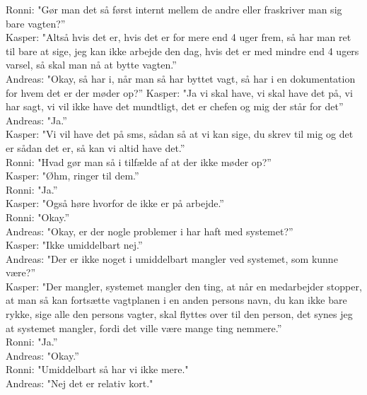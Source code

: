 Ronni: "Gør man det så først internt mellem de andre eller fraskriver man sig bare vagten?”\\
Kasper: "Altså hvis det er, hvis det er for mere end 4 uger frem, så har man ret til bare at sige, jeg kan ikke arbejde den dag, hvis det er med mindre end 4 ugers varsel, så skal man nå at bytte vagten.”\\
Andreas: "Okay, så har i, når man så har byttet vagt, så har i en dokumentation for hvem det er der møder op?”
Kasper: "Ja vi skal have, vi skal have det på, vi har sagt, vi vil ikke have det mundtligt, det er chefen og mig der står for det”\\
Andreas: "Ja.”\\
Kasper: "Vi vil have det på sms, sådan så at vi kan sige, du skrev til mig og det er sådan det er, så kan vi altid have det.”\\
Ronni: "Hvad gør man så i tilfælde af at der ikke møder op?”\\
Kasper: "Øhm, ringer til dem.”\\
Ronni: "Ja.”\\
Kasper: "Også høre hvorfor de ikke er på arbejde.”\\
Ronni: "Okay.”\\
Andreas: "Okay, er der nogle problemer i har haft med systemet?”\\
Kasper: "Ikke umiddelbart nej.”\\
Andreas: "Der er ikke noget i umiddelbart mangler ved systemet, som kunne være?”\\
Kasper: "Der mangler, systemet mangler den ting, at når en medarbejder stopper, at man så kan fortsætte vagtplanen i en anden persons navn, du kan ikke bare rykke, sige alle den persons vagter, skal flyttes over til den person, det synes jeg at systemet mangler, fordi det ville være mange ting nemmere.”\\
Ronni: "Ja.”\\
Andreas: "Okay.”\\
Ronni: "Umiddelbart så har vi ikke mere."\\
Andreas: "Nej det er relativ kort."\\
